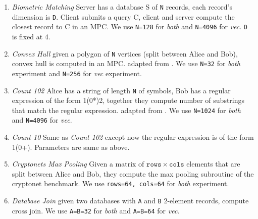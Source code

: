 

\begin{enumerate}
    \item {\em Biometric Matching} Server has a database S of {\tt N} records, each record's dimension is {\tt D}. Client submits a query C, client and server compute the closest record to C in an MPC. We use {\tt N=128} for {\em both} and {\tt N=4096} for {\em vec}. {\tt D} is fixed at 4.
    
    
    \item {\em Convex Hull} given a polygon of {\tt N} vertices (split between Alice and Bob), convex hull is computed in an MPC. adapted from \cite{Farzan:2021}. We use {\tt N=32} for {\em both} experiment and {\tt N=256} for {\em vec} experiment.
    
    \item {\em Count 102} Alice has a string of length {\tt N} of symbols, Bob has a regular expression of the form 1(0*)2, together they compute number of substrings that match the regular expression. adapted from \cite{Farzan:2021}. We use {\tt N=1024} for {\em both} and {\tt N=4096} for {\em vec}.
    
    \item {\em Count 10} Same as {\em Count 102} except now the regular expression is of the form 1(0+). Parameters are same as above.
    
    \item {\em Cryptonets Max Pooling} Given a matrix of $\mathtt{rows}\times\mathtt{cols}$ elements that are split between Alice and Bob, they compute the max pooling subroutine of the cryptonet benchmark\cite{Dowlin:2016}. We use {\tt rows=64, cols=64} for {\em both} experiment.

    \item {\em Database Join} given two databases with {\tt A} and {\tt B} 2-element records, compute cross join. We use {\tt A=B=32} for {\em both} and {\tt A=B=64} for {\em vec}.
    

\end{enumerate}
